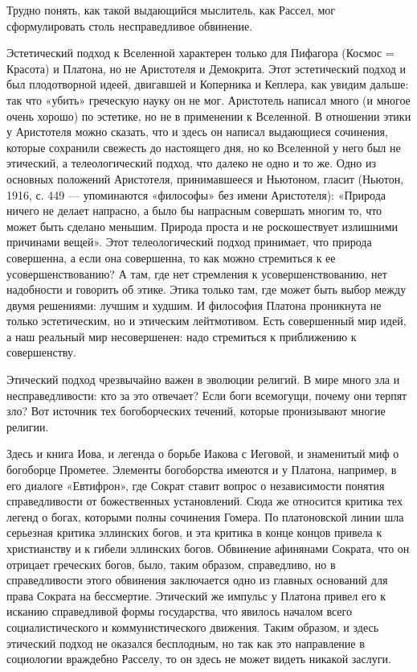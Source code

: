Трудно  понять,  как  такой  выдающийся  мыслитель,  как  Рассел,  мог
сформулировать столь несправедливое обвинение.

Эстетический подход к Вселенной характерен только для Пифагора (Космос
= Красота) и Платона, но  не Аристотеля и Демокрита. Этот эстетический
подход и был плодотворной идеей,  двигавшей и Коперника и Кеплера, как
увидим дальше: так  что «убить» греческую науку он  не мог. Аристотель
написал много (и многое очень хорошо)  по эстетике, но не в применении
к  Вселенной. В  отношении этики  у  Аристотеля можно  сказать, что  и
здесь  он написал  выдающиеся  сочинения,  которые сохранили  свежесть
до  настоящего  дня, но  ко  Вселенной  у  него  был не  этический,  а
телеологический подход, что  далеко не одно и то же.  Одно из основных
положений Аристотеля, принимавшееся и  Ньютоном, гласит (Ньютон, 1916,
с.  449 ---  упоминаются  «философы» без  имени Аристотеля):  «Природа
ничего не  делает напрасно, а  было бы напрасным совершать  многим то,
что  может быть  сделано меньшим.  Природа проста  и не  роскошествует
излишними причинами вещей». Этот телеологический подход принимает, что
природа совершенна, а  если она совершенна, то как  можно стремиться к
ее усовершенствованию? А там, где нет стремления к усовершенствованию,
нет надобности и  говорить об этике. Этика только там,  где может быть
выбор  между двумя  решениями: лучшим  и худшим.  И философия  Платона
проникнута не  только эстетическим,  но и этическим  лейтмотивом. Есть
совершенный мир идей, а наш реальный мир несовершенен: надо стремиться
к приближению к совершенству.

Этический подход  чрезвычайно важен в  эволюции религий. В  мире много
зла  и несправедливости:  кто за  это отвечает?  Если боги  всемогущи,
почему они терпят зло? Вот источник тех богоборческих течений, которые
пронизывают многие религии.

Здесь и книга Иова, и легенда  о борьбе Иакова с Иеговой, и знаменитый
миф о  богоборце Прометее. Элементы  богоборства имеются и  у Платона,
например,  в  его  диалоге  «Евтифрон», где  Сократ  ставит  вопрос  о
независимости  понятия  справедливости от  божественных  установлений.
Сюда же относится критика тех легенд о богах, которыми полны сочинения
Гомера. По платоновской линии шла серьезная критика эллинских богов, и
эта критика в конце концов привела к христианству и к гибели эллинских
богов. Обвинение  афинянами Сократа, что он  отрицает греческих богов,
было, таким образом, справедливо,  но в справедливости этого обвинения
заключается одно из главных оснований для права Сократа на бессмертие.
Этический  же импульс  у  Платона привел  его  к исканию  справедливой
формы  государства,  что  явилось началом  всего  социалистического  и
коммунистического движения. Таким образом, и здесь этический подход не
оказался бесплодным, но так как это направление в социологии враждебно
Расселу, то он здесь не может видеть никакой заслуги.

